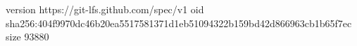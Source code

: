 version https://git-lfs.github.com/spec/v1
oid sha256:404f9970dc46b20ea5517581371d1eb51094322b159bd42d866963cb1b65f7ec
size 93880
